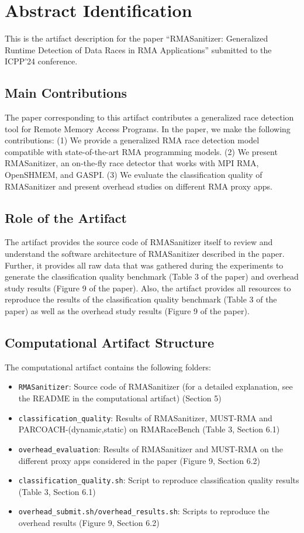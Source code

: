 \documentclass[twoside]{article}
\begin{document}
\section*{Abstract Identification}
This is the artifact description for the paper ``RMASanitizer: Generalized Runtime Detection of Data Races in RMA Applications'' submitted to the ICPP'24 conference.


\subsection*{Main Contributions}
The paper corresponding to this artifact contributes a generalized race detection tool for Remote Memory Access Programs. In the paper, we make the following contributions: (1) We provide a generalized RMA race detection model compatible with state-of-the-art RMA programming models. (2) We present RMASanitizer, an on-the-fly race detector that works with MPI RMA, OpenSHMEM, and GASPI. (3) We evaluate the classification quality of RMASanitizer and present overhead studies on different RMA proxy apps.

\subsection*{Role of the Artifact}
The artifact provides the source code of RMASanitizer itself to review and understand the software architecture of RMASanitizer described in the paper. Further, it provides all raw data that was gathered during the experiments to generate the classification quality benchmark (Table 3 of the paper) and overhead study results (Figure 9 of the paper). Also, the artifact provides all resources to reproduce the results of the classification quality benchmark (Table 3 of the paper) as well as the overhead study results (Figure 9 of the paper).


\subsection*{Computational Artifact Structure}
The computational artifact contains the following folders:
\begin{itemize}
    \item \texttt{RMASanitizer}: Source code of RMASanitizer (for a detailed explanation, see the README in the computational artifact) (Section 5)
    \item \texttt{classification\_quality}: Results of RMASanitizer, MUST-RMA and PARCOACH-(dynamic,static) on RMARaceBench (Table 3, Section 6.1)
    \item \texttt{overhead\_evaluation}: Results of RMASanitizer and MUST-RMA on the different proxy apps considered in the paper (Figure 9, Section 6.2)
    \item \texttt{classification\_quality.sh}: Script to reproduce classification quality results (Table 3, Section 6.1)
    \item \texttt{overhead\_submit.sh/overhead\_results.sh}: Scripts to reproduce the overhead results (Figure 9, Section 6.2)
\end{itemize}
\end{document}
